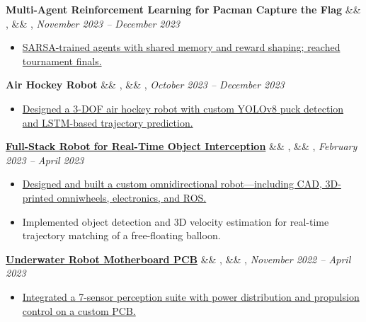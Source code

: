 \documentclass[letterpaper,10pt]{article}
\newcommand{\experience}[5]{%
    \vspace{-1mm}%
    \noindent\textbf{#1}%
    \ifx&#2&
    \else
        , \textit{#2}%
    \fi
    \ifx&#3&
    \else
        , #3%
    \fi
    \hfill \textit{#4} \\
    \vspace{-6.8mm}%
    \begin{itemize}[itemsep=-5pt]
        \setlength{\itemindent}{0em}
        #5
    \end{itemize}
}
\begin{document}
\experience
    {Multi-Agent Reinforcement Learning for Pacman Capture the Flag}
    {}
    {}
    {November 2023 – December 2023}
    {
        \item \href{https://github.com/ryan-barry-99/AI_Explorations_Pacman_Capture_the_Flag}{SARSA-trained agents with shared memory and reward shaping; reached tournament finals.}
    }


    
\experience
    {Air Hockey Robot}
    {}
    {}
    {October 2023 – December 2023}
    {
        \item \href{https://ryanbarry.me/projects/robotics/air-hockey-robot/}{Designed a 3-DOF air hockey robot with custom YOLOv8 puck detection and LSTM-based trajectory prediction.}
    }


    
\experience
    {\href{https://ryanbarry.me/projects/robotics/omnidirectional-robot/}{Full-Stack Robot for Real-Time Object Interception}}
    {}
    {}
    {February 2023 – April 2023}
    {

        \item \href{https://github.com/ryan-barry-99/Trajectory-Matching-Omnidirectional-Robot/tree/main/}{Designed and built a custom omnidirectional robot—including CAD, 3D-printed omniwheels, electronics, and ROS.}
        \item Implemented object detection and 3D velocity estimation for real-time trajectory matching of a free-floating balloon.
    }
    
\experience
    {\href{https://ryanbarry.me/projects/electrical-engineering/underwater-robot/}{Underwater Robot Motherboard PCB}}
    {}
    {}
    {November 2022 – April 2023}
    {
        \item \href{https://ryanbarry.me/projects/electrical-engineering/underwater-robot/}{Integrated a 7-sensor perception suite with power distribution and propulsion control on a custom PCB.}
        
    }
    
\end{document}
